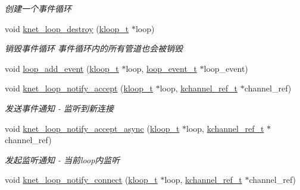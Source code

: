 \begin{DoxyCompactItemize}
\begin{DoxyCompactList}\small\item\em 创建一个事件循环 \end{DoxyCompactList}\item 
void \hyperlink{a00108_ga390ea3161f935d0d3a411df8752d8b9f_ga390ea3161f935d0d3a411df8752d8b9f}{knet\+\_\+loop\+\_\+destroy} (\hyperlink{a00053_a97fc76209a58362019f1ded9169e397f_a97fc76209a58362019f1ded9169e397f}{kloop\+\_\+t} $\ast$loop)
\begin{DoxyCompactList}\small\item\em 销毁事件循环 事件循环内的所有管道也会被销毁 \end{DoxyCompactList}\item 
void \hyperlink{a00071_a5ea05a43d50e68497c792f77cb112334_a5ea05a43d50e68497c792f77cb112334}{loop\+\_\+add\+\_\+event} (\hyperlink{a00053_a97fc76209a58362019f1ded9169e397f_a97fc76209a58362019f1ded9169e397f}{kloop\+\_\+t} $\ast$loop, \hyperlink{a00071_a1095ee772017ce29dcac0987c456709e_a1095ee772017ce29dcac0987c456709e}{loop\+\_\+event\+\_\+t} $\ast$loop\+\_\+event)
\item 
void \hyperlink{a00071_ab2829c911d0a52d4a59951cf2805c68c_ab2829c911d0a52d4a59951cf2805c68c}{knet\+\_\+loop\+\_\+notify\+\_\+accept} (\hyperlink{a00053_a97fc76209a58362019f1ded9169e397f_a97fc76209a58362019f1ded9169e397f}{kloop\+\_\+t} $\ast$loop, \hyperlink{a00053_a3b7e82599367eade261456f60ebe2cd9_a3b7e82599367eade261456f60ebe2cd9}{kchannel\+\_\+ref\+\_\+t} $\ast$channel\+\_\+ref)
\begin{DoxyCompactList}\small\item\em 发送事件通知 -\/ 监听到新连接 \end{DoxyCompactList}\item 
void \hyperlink{a00071_a3748a72ab4d7a23ee408d0cdf1fd1acb_a3748a72ab4d7a23ee408d0cdf1fd1acb}{knet\+\_\+loop\+\_\+notify\+\_\+accept\+\_\+async} (\hyperlink{a00053_a97fc76209a58362019f1ded9169e397f_a97fc76209a58362019f1ded9169e397f}{kloop\+\_\+t} $\ast$loop, \hyperlink{a00053_a3b7e82599367eade261456f60ebe2cd9_a3b7e82599367eade261456f60ebe2cd9}{kchannel\+\_\+ref\+\_\+t} $\ast$channel\+\_\+ref)
\begin{DoxyCompactList}\small\item\em 发起监听通知 -\/ 当前loop内监听 \end{DoxyCompactList}\item 
void \hyperlink{a00071_aed97725b0a9706543e9b31b604483740_aed97725b0a9706543e9b31b604483740}{knet\+\_\+loop\+\_\+notify\+\_\+connect} (\hyperlink{a00053_a97fc76209a58362019f1ded9169e397f_a97fc76209a58362019f1ded9169e397f}{kloop\+\_\+t} $\ast$loop, \hyperlink{a00053_a3b7e82599367eade261456f60ebe2cd9_a3b7e82599367eade261456f60ebe2cd9}{kchannel\+\_\+ref\+\_\+t} $\ast$channel\+\_\+ref)

\end{DoxyCompactItemize}
